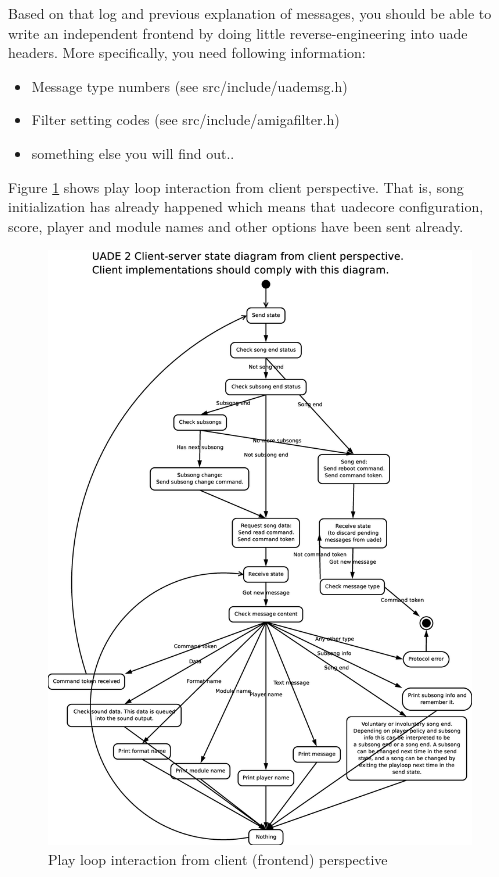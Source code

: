 \documentclass{article}
\begin{document}
Based on that log and previous explanation of messages, you should be able
to write an independent frontend by doing little reverse-engineering into
uade headers. More specifically, you need following information:
\begin{itemize}
\item Message type numbers (see \mbox{src/include/uademsg.h})
\item Filter setting codes (see \mbox{src/include/amigafilter.h})
\item something else you will find out..
\end{itemize}

Figure \ref{fig:playloop} shows play loop interaction from client
perspective. That is, song initialization has already happened which means
that uadecore configuration, score, player and module names and other
options have been sent already.

\begin{figure}
\centering
\includegraphics[scale=0.25]{play_loop_state_diagram.eps}
\caption{Play loop interaction from client (frontend) perspective}
\label{fig:playloop}
\end{figure}
\end{document}
